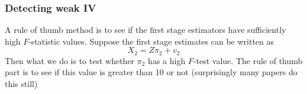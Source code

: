 \documentclass[12pt]{article}
\theoremstyle{definition}
\theoremstyle{property}
\theoremstyle{assumption}
\theoremstyle{example}
\theoremstyle{comment}
\newtheorem{comment}{Comment}[section]
\begin{document}
\begin{mdframed}[backgroundcolor=yellow!5]

\end{mdframed}


\subsubsection{Detecting weak IV}
A rule of thumb method is to see if the first stage estimators have sufficiently high $F$-statistic values. Suppose the first stage estimates can be written as
\[
X_2 = Z\pi_2+ v_2
\]
Then what we do is to test whether $\pi_2$ has a high $F$-test value. The rule of thumb part is to see if this value is greater than 10 or not (surprisingly many papers do this still) \par

\end{document}
